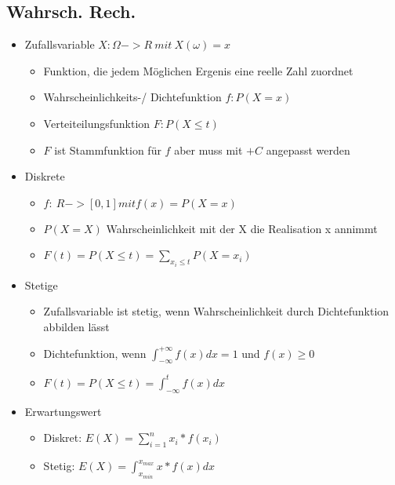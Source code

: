 \documentclass[a4paper]{article}
\begin{document}
\begin{landscape}
\begin{multicols}{4}
    \section{Wahrsch. Rech.}
    \begin{itemize}[noitemsep,nolistsep,leftmargin=*]
        \item Zufallsvariable $X : \Omega -> R\: mit\: X(\omega) = x$
        \begin{itemize}[noitemsep,nolistsep,leftmargin=*]
            \item Funktion, die jedem Möglichen Ergenis eine reelle Zahl zuordnet
            \item Wahrscheinlichkeits-/ Dichtefunktion $f: P(X =x)$
            \item Verteiteilungsfunktion $F: P(X  \leq t)$
            \item $F$ ist Stammfunktion für $f$ aber muss mit $+C$ angepasst werden
        \end{itemize}
        \item Diskrete
        \begin{itemize}[noitemsep,nolistsep,leftmargin=*]
            \item $f: \:R->[0,1] mit f(x)=P(X=x)$
            \item $P(X=X)$ Wahrscheinlichkeit mit der X die Realisation x annimmt
            \item $F(t) = P(X  \leq t) = \sum_{x_i  \leq t} P(X = x_i)$
        \end{itemize}
        \item Stetige
        \begin{itemize}[noitemsep,nolistsep,leftmargin=*]
            \item Zufallsvariable ist stetig, wenn Wahrscheinlichkeit durch Dichtefunktion abbilden lässt
            \item Dichtefunktion, wenn $\int^{+\infty}_{-\infty} f(x) dx = 1$ und $f(x)  \geq 0$
            \item $F(t) = P(X  \leq t) = \int^{t}_{-\infty} f(x)dx$
        \end{itemize}
        \item Erwartungswert
        \begin{itemize}[noitemsep,nolistsep,leftmargin=*]
            \item Diskret: $E(X) = \sum^n_{i=1} x_i * f(x_i)$
            \item Stetig: $E(X) = \int^{x_{max}}_{x_{min}} x * f(x) dx$
        \end{itemize}

\end{itemize}
\end{multicols}
\end{landscape}
\end{document}

